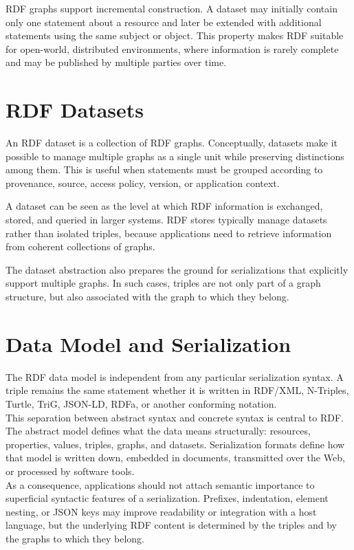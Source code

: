 \documentclass{scrbook}
\begin{document}
	RDF graphs support incremental construction. A dataset may initially contain only one statement about a resource and later be extended with additional statements using the same subject or object. This property makes RDF suitable for open-world, distributed environments, where information is rarely complete and may be published by multiple parties over time.
	
	\section{RDF Datasets}
	
	An RDF dataset is a collection of RDF graphs. Conceptually, datasets make it possible to manage multiple graphs as a single unit while preserving distinctions among them. This is useful when statements must be grouped according to provenance, source, access policy, version, or application context.
	
	A dataset can be seen as the level at which RDF information is exchanged, stored, and queried in larger systems. RDF stores typically manage datasets rather than isolated triples, because applications need to retrieve information from coherent collections of graphs.
	
	The dataset abstraction also prepares the ground for serializations that explicitly support multiple graphs. In such cases, triples are not only part of a graph structure, but also associated with the graph to which they belong.
	
	\section{Data Model and Serialization}
	
	The RDF data model is independent from any particular serialization syntax. A triple remains the same statement whether it is written in RDF/XML, N-Triples, Turtle, TriG, JSON-LD, RDFa, or another conforming notation.\\
	
	This separation between abstract syntax and concrete syntax is central to RDF. The abstract model defines what the data means structurally: resources, properties, values, triples, graphs, and datasets. Serialization formats define how that model is written down, embedded in documents, transmitted over the Web, or processed by software tools.\\
	
	As a consequence, applications should not attach semantic importance to superficial syntactic features of a serialization. Prefixes, indentation, element nesting, or JSON keys may improve readability or integration with a host language, but the underlying RDF content is determined by the triples and by the graphs to which they belong.
	
\end{document}
